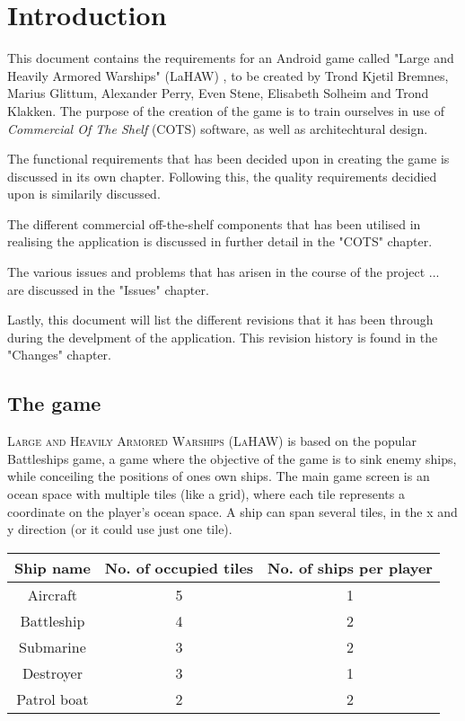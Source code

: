 \chapter{Introduction}
This document contains the requirements for an Android game called "Large and Heavily Armored Warships" (LaHAW) , to be created by Trond Kjetil Bremnes, Marius Glittum, Alexander Perry, Even Stene, Elisabeth Solheim and Trond Klakken. The purpose of the creation of the game is to train ourselves in use of \emph{Commercial Of The Shelf} (COTS) software, as well as architechtural design.

The functional requirements that has been decided upon in creating the game is discussed in its own chapter. Following this, the quality requirements decidied upon is similarily discussed.

The different commercial off-the-shelf components that has been utilised in realising the application is discussed in further detail in the "COTS" chapter.

The various issues and problems that has arisen in the course of the project ...
are discussed in the "Issues" chapter.

Lastly, this document will list the different revisions that it has been through during the develpment of the application. This revision history is found in the "Changes" chapter.



\section{The game}
\textsc{Large and Heavily Armored Warships (LaHAW)} is based on the popular Battleships\cite{battleship} game, a game where the objective of the game is to sink enemy ships, while conceiling the positions of ones own ships. The main game screen is an ocean space with multiple tiles (like a grid), where each tile represents a coordinate on the player's ocean space. A ship can span several tiles, in the x and y direction (or it could use just one tile). 
\\


\begin{tabular}{| c | c | c |}
    \hline
    \rowcolor[gray]{0.8}
    \hspace{0.3cm}\textbf{Ship name}\hspace{0.3cm} & \textbf{No. of occupied tiles} & \textbf{No. of ships per player} \\
    \hline
    Aircraft & 5 & 1 \\
    Battleship & 4 & 2 \\
    Submarine & 3 & 2 \\
    Destroyer & 3 & 1 \\
    Patrol boat & 2 & 2 \\
    \hline
\end{tabular}
\label{shiptable}





